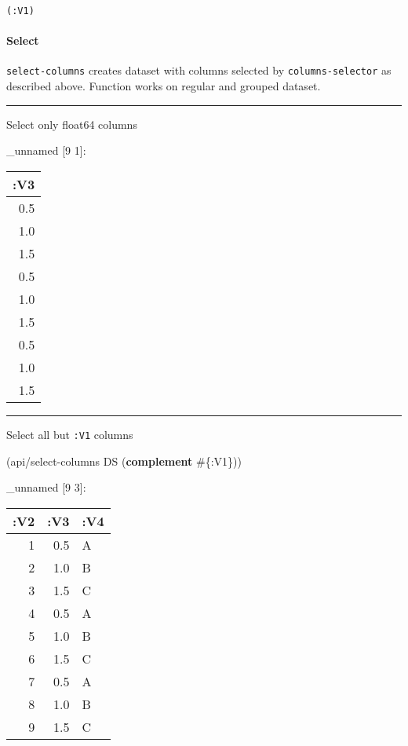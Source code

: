 \documentclass[]{article}
\newenvironment{Shaded}{\begin{snugshade}}{\end{snugshade}}
\newcommand{\KeywordTok}[1]{\textcolor[rgb]{0.13,0.29,0.53}{\textbf{#1}}}
\newcommand{\VariableTok}[1]{\textcolor[rgb]{0.00,0.00,0.00}{#1}}
\newcommand{\AttributeTok}[1]{\textcolor[rgb]{0.77,0.63,0.00}{#1}}
\newcommand{\NormalTok}[1]{#1}
\let\oldparagraph\paragraph
\renewcommand{\paragraph}[1]{\oldparagraph{#1}\mbox{}}
\begin{document}
\begin{verbatim}
(:V1)
\end{verbatim}

\paragraph{Select}\label{select}

\texttt{select-columns} creates dataset with columns selected by
\texttt{columns-selector} as described above. Function works on regular
and grouped dataset.

\begin{center}\rule{0.5\linewidth}{0.5pt}\end{center}

Select only float64 columns

\begin{Shaded}
\end{Shaded}

\_unnamed {[}9 1{]}:

\begin{longtable}[]{@{}r@{}}
\toprule
:V3\tabularnewline
\midrule
\endhead
0.5\tabularnewline
1.0\tabularnewline
1.5\tabularnewline
0.5\tabularnewline
1.0\tabularnewline
1.5\tabularnewline
0.5\tabularnewline
1.0\tabularnewline
1.5\tabularnewline
\bottomrule
\end{longtable}

\begin{center}\rule{0.5\linewidth}{0.5pt}\end{center}

Select all but \texttt{:V1} columns

\begin{Shaded}
\begin{Highlighting}[]
\NormalTok{(api/select-columns DS (}\KeywordTok{complement}\NormalTok{ #\{}\AttributeTok{:V1}\NormalTok{\}))}
\end{Highlighting}
\end{Shaded}

\_unnamed {[}9 3{]}:

\begin{longtable}[]{@{}rrl@{}}
\toprule
:V2 & :V3 & :V4\tabularnewline
\midrule
\endhead
1 & 0.5 & A\tabularnewline
2 & 1.0 & B\tabularnewline
3 & 1.5 & C\tabularnewline
4 & 0.5 & A\tabularnewline
5 & 1.0 & B\tabularnewline
6 & 1.5 & C\tabularnewline
7 & 0.5 & A\tabularnewline
8 & 1.0 & B\tabularnewline
9 & 1.5 & C\tabularnewline
\bottomrule
\end{longtable}
\end{document}
